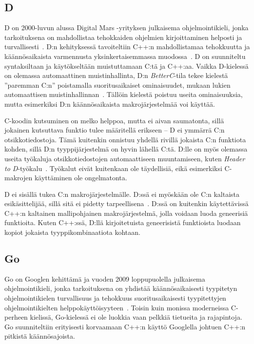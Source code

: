 \subsection{D}

D on 2000-luvun alussa Digital Mars -yrityksen julkaisema ohjelmointikieli,
jonka tarkoituksena on mahdollistaa tehokkaiden ohjelmien kirjoittaminen
helposti ja turvallisesti~\citep{dhistory}. D:n kehityksessä tavoiteltiin C++:n
mahdollistamaa tehokkuutta ja käännösaikaista varmennusta yksinkertaisemmassa
muodossa~\citep[s. xix--xx]{dbook}. D on suunniteltu syntaksiltaan ja
käytökseltään muistuttamaan C:tä ja C++:aa. Vaikka D-kielessä on olemassa
automaattinen muistinhallinta, D:n \emph{BetterC}-tila tekee kielestä
''paremman C:n'' poistamalla suoritusaikaiset ominaisuudet, mukaan lukien
automaattisen muistinhallinnan~\citep{dbetterc}. Tällöin kielestä poistuu
useita ominaisuuksia, mutta esimerkiksi D:n käännösaikaista makrojärjestelmää
voi käyttää.

C-koodin kutsuminen on melko helppoa, mutta ei aivan saumatonta, sillä jokainen
kutsuttava funktio tulee määritellä erikseen -- D ei ymmärrä C:n
otsikkotiedostoja. Tämä kuitenkin onnistuu yhdellä rivillä jokaista C:n
funktiota kohden, sillä D:n tyyppijärjestelmä on hyvin lähellä C:tä. D:lle on
myös olemassa useita työkaluja otsikkotiedostojen automaattiseen muuntamiseen,
kuten \emph{Header to D}-työkalu~\citep{htod}. Työkalut eivät kuitenkaan ole
täydellisiä, eikä esimerkiksi C-makrojen käyttäminen ole ongelmatonta.

D ei sisällä tukea C:n makrojärjestelmälle. D:ssä ei myöskään ole C:n kaltaista
esikäsittelijää, sillä sitä ei pidetty tarpeellisena~\citep{pretod}. D:ssä on
kuitenkin käytettävissä C++:n kaltainen mallipohjainen makrojärjestelmä, jolla
voidaan luoda geneerisiä funktioita. Kuten C++:ssä, D:llä kirjoitetuista
geneerisistä funktioista luodaan kopiot jokaista tyyppikombinaatiota kohtaan.

\subsection{Go}
\label{sec:go}

Go on Googlen kehittämä ja vuoden 2009 loppupuolella julkaisema
ohjelmointikieli, jonka tarkoituksena on yhdistää käännösaikaisesti tyypitetyn
ohjelmointikielen turvallisuus ja tehokkuus suoritusaikaisesti tyypitettyjen
ohjelmointikielten helppokäyttöisyyteen~\citep{gohistory}. Toisin kuin monissa
moderneissa C-perheen kielissä, Go-kielessä ei ole luokkia vaan pelkkiä
tietueita ja rajapintoja. Go suunniteltiin erityisesti korvaamaan C++:n käyttö
Googlella johtuen C++:n pitkistä käännösajoista.

